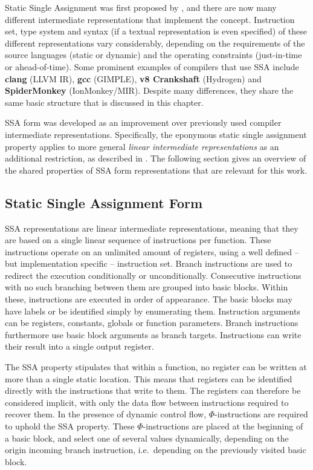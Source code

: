     Static Single Assignment was first proposed by
    \citet{Rosen:1988:GVN:73560.73562}, and there are now many different
    intermediate representations that implement the concept.
    Instruction set, type system and syntax
    (if a textual representation is even specified) of these different
    representations vary
    considerably, depending on the requirements of the source languages
    (static or dynamic) and the operating constraints
    (just-in-time or ahead-of-time).
    Some prominent examples of compilers that use SSA include
    {\bf clang} (LLVM IR), {\bf gcc} (GIMPLE), {\bf v8 Crankshaft} (Hydrogen)
    and {\bf SpiderMonkey} (IonMonkey/MIR).
    Despite many differences, they share the same basic structure that is
    discussed in this chapter.

    SSA form was developed as an improvement over previously used compiler
    intermediate representations.
    Specifically, the eponymous static single assignment property applies to
    more general {\em linear intermediate representations} as an additional
    restriction, as described in \citet{Torczon:2007:EC:1526330}.
    The following section gives an overview of the shared properties of SSA form
    representations that are relevant for this work.

\subsection{Static Single Assignment Form}

    SSA representations are linear intermediate representations, meaning that
    they are based on a single linear sequence of instructions per function.
    These instructions operate on an unlimited amount of registers, using a well
    defined -- but implementation specific -- instruction set.
    Branch instructions are used to redirect the execution conditionally or
    unconditionally.
    Consecutive instructions with no such branching between them are grouped
    into basic blocks.
    Within these, instructions are executed in order of appearance.
    The basic blocks may have labels or be identified simply by enumerating
    them.
    Instruction arguments can be registers, constants, globals or function
    parameters.
    Branch instructions furthermore use basic block arguments as branch targets.
    Instructions can write their result into a single output register.

    The SSA property stipulates that within a function, no register can be
    written at more than a single static location.
    This means that registers can be identified directly with the instructions
    that write to them.
    The registers can therefore be considered implicit, with only the data flow
    between instructions required to recover them.
    In the presence of dynamic control flow, \mbox{$\Phi$-instructions} are
    required to uphold the SSA property.
    These \mbox{$\Phi$-instructions} are placed at the beginning of a basic
    block, and select one of several values dynamically, depending on the origin
    incoming branch instruction, i.e.\ depending on the previously visited
    basic block.

